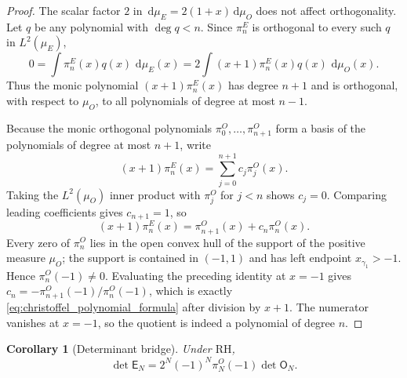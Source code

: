 \documentclass[11pt]{amsart}
\numberwithin{equation}{section}
\theoremstyle{plain}
\newtheorem{corollary}[theorem]{Corollary}
\theoremstyle{definition}
\theoremstyle{remark}
\newcommand{\RH}{\mathrm{RH}}
\newcommand{\E}{\mathsf E}
\newcommand{\Omat}{\mathsf O}
\newcommand{\dd}{\,\mathrm d}
\begin{document}
\begin{proof}
The scalar factor $2$ in $\dd\mu_E=2(1+x)\dd\mu_O$ does not affect orthogonality.  Let $q$ be any polynomial with $\deg q<n$.  Since $\pi_n^E$ is orthogonal to every such $q$ in $L^2(\mu_E)$,
\begin{equation}
0=\int \pi_n^E(x)q(x)\,\dd\mu_E(x)
=2\int (x+1)\pi_n^E(x)q(x)\,\dd\mu_O(x).
\end{equation}
Thus the monic polynomial $(x+1)\pi_n^E(x)$ has degree $n+1$ and is orthogonal, with respect to $\mu_O$, to all polynomials of degree at most $n-1$.

Because the monic orthogonal polynomials $\pi_0^O,\ldots,\pi_{n+1}^O$ form a basis of the polynomials of degree at most $n+1$, write
\begin{equation}
(x+1)\pi_n^E(x)=\sum_{j=0}^{n+1}c_j\pi_j^O(x).
\end{equation}
Taking the $L^2(\mu_O)$ inner product with $\pi_j^O$ for $j<n$ shows $c_j=0$.  Comparing leading coefficients gives $c_{n+1}=1$, so
\begin{equation}
(x+1)\pi_n^E(x)=\pi_{n+1}^O(x)+c_n\pi_n^O(x).
\end{equation}
Every zero of $\pi_n^O$ lies in the open convex hull of the support of the positive measure $\mu_O$; the support is contained in $( -1,1)$ and has left endpoint $x_{\gamma_1}>-1$.  Hence $\pi_n^O(-1)\ne0$.  Evaluating the preceding identity at $x=-1$ gives
$c_n=-\pi_{n+1}^O(-1)/\pi_n^O(-1)$, which is exactly \eqref{eq:christoffel_polynomial_formula} after division by $x+1$.  The numerator vanishes at $x=-1$, so the quotient is indeed a polynomial of degree $n$.
\end{proof}

\begin{corollary}[Determinant bridge]
\label{cor:determinant_bridge}
Under $\RH$,
\begin{equation}
\det\E_N
=2^N(-1)^N\pi_N^O(-1)\det\Omat_N.
\label{eq:determinant_bridge}
\end{equation}
\end{corollary}
\end{document}

